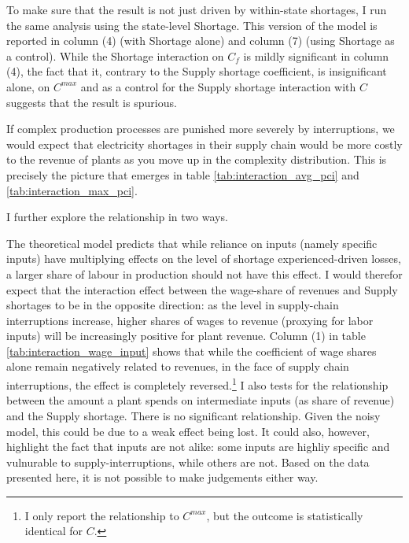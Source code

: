 \documentclass[11pt]{article}
\begin{document}
To make sure that the result is not just driven by within-state shortages, I run the same analysis using the state-level Shortage. This version of the model is reported in column (4) (with Shortage alone) and column (7) (using Shortage as a control). While the Shortage interaction on $C_f$ is mildly significant in column (4), the fact that it, contrary to the Supply shortage coefficient, is insignificant alone, on $C^{max}$ and as a control for the Supply shortage interaction with $C$ suggests that the result is spurious. 

If complex production processes are punished more severely by interruptions, we would expect that electricity shortages in their supply chain would be more costly to the revenue of plants as you move up in the complexity distribution. This is precisely the picture that emerges in table \ref{tab:interaction_avg_pci} and \ref{tab:interaction_max_pci}.  

I further explore the relationship in two ways.

The theoretical model predicts that while reliance on inputs (namely specific inputs) have multiplying effects on the level of shortage experienced-driven losses, a larger share of labour in production should not have this effect. I would therefor expect that the interaction effect between the wage-share of revenues and Supply shortages to be in the opposite direction: as the level in supply-chain interruptions increase, higher shares of wages to revenue (proxying for labor inputs) will be increasingly positive for plant revenue. Column (1) in table \ref{tab:interaction_wage_input} shows that while the coefficient of wage shares alone remain negatively related to revenues, in the face of supply chain interruptions, the effect is completely reversed.\footnote{I only report the relationship to $C^{max}$, but the outcome is statistically identical for $C$.} I also tests for the relationship between the amount a plant spends on intermediate inputs (as  share of revenue) and the Supply shortage. There is no significant relationship. Given the noisy model, this could be due to a weak effect being lost. It could also, however, highlight the fact that inputs are not alike: some inputs are highliy specific and vulnurable to supply-interruptions, while others are not. Based on the data presented here, it is not possible to make judgements either way.
\end{document}
